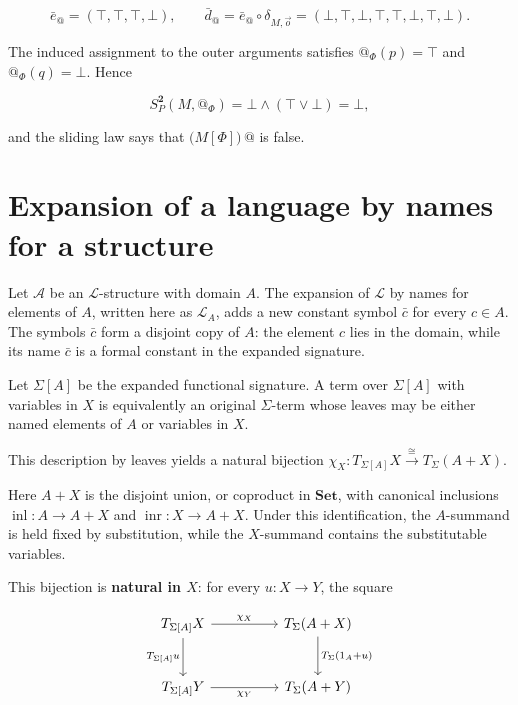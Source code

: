 \documentclass[11pt]{article}
\makeatletter
\newcommand{\atsign}{\mathord{@}}
\theoremstyle{definition}
\makeatother
\begin{document}
\[
\bar e_{\atsign}=(\top,\top,\top,\bot),
\qquad
\bar d_{\atsign}
=\bar e_{\atsign}\circ\delta_{M,\vec o}
=(\bot,\top,\bot,\top,\top,\bot,\top,\bot).
\]

The induced assignment to the outer arguments satisfies
\(\atsign_\Phi(p)=\top\) and \(\atsign_\Phi(q)=\bot\). Hence

\[
S_P^{\mathbf 2}(M,\atsign_\Phi)
=\bot\wedge(\top\vee\bot)=\bot,
\]

and the sliding law says that \(\bigl(M[\Phi]\bigr)\,\atsign\) is false.


\section{Expansion of a language by names for a
structure}\label{expansion-of-a-language-by-names-for-a-structure}

Let \(\mathcal A\) be an \(\mathcal L\)-structure with domain \(A\). The
expansion of \(\mathcal L\) by names for elements of \(A\), written here
as \(\mathcal L_A\), adds a new constant symbol \(\bar c\) for every
\(c\in A\). The symbols \(\bar c\) form a disjoint copy of \(A\): the
element \(c\) lies in the domain, while its name \(\bar c\) is a formal
constant in the expanded signature.

Let \(\Sigma[A]\) be the expanded functional signature. A term over
\(\Sigma[A]\) with variables in \(X\) is equivalently an original
\(\Sigma\)-term whose leaves may be either named elements of \(A\) or
variables in \(X\).

This description by leaves yields a natural bijection
\(\chi_X:T_{\Sigma[A]}X\xrightarrow{\cong}T_\Sigma(A+X)\).

Here \(A+X\) is the disjoint union, or coproduct in \(\mathbf{Set}\),
with canonical inclusions \(\operatorname{inl}:A\to A+X\) and
\(\operatorname{inr}:X\to A+X\). Under this identification, the
\(A\)-summand is held fixed by substitution, while the \(X\)-summand
contains the substitutable variables.

This bijection is \textbf{natural in \(X\)}: for every \(u:X\to Y\), the
square

\[
\begin{tikzcd}[row sep=large,column sep=huge]
T_{\Sigma[A]}X \arrow[r,"\chi_X"] \arrow[d,"T_{\Sigma[A]}u"'] &
T_\Sigma(A+X) \arrow[d,"T_\Sigma(1_A+u)"] \\
T_{\Sigma[A]}Y \arrow[r,"\chi_Y"'] & T_\Sigma(A+Y)
\end{tikzcd}
\]
\end{document}
